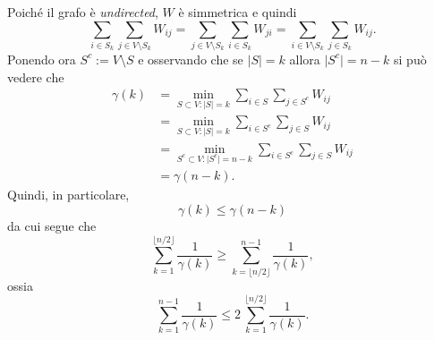 \begin{alphaparts}
Poiché il grafo è \textit{undirected}, $W$ è simmetrica e quindi
\[\sum_{i\in S_{k}} \sum_{j\in V\setminus S_{k} } W_{ij} =  \sum_{j\in V\setminus S_{k} } \sum_{i\in S_{k}} W_{ji} = \sum_{i\in V\setminus S_{k} } \sum_{j\in S_{k}} W_{ij}. \]
Ponendo ora \( S^{c} := V\setminus S \) e osservando che se \( \vert S \vert = k\) allora \(\vert S^{c} \vert = n-k\) si può vedere che
\begin{align}
\gamma(k) &= \min_{S\subset V : \vert S \vert = k} \sum_{i\in S}\sum_{j\in S^{c}} W_{ij} \nonumber\\
&= \min_{S\subset V : \vert S \vert = k} \sum_{i\in S^{c}}\sum_{j\in S} W_{ij} \nonumber\\
&= \min_{S^{c}\subset V : \vert S^{c} \vert = n - k} \sum_{i\in S^{c}}\sum_{j\in S} W_{ij} \nonumber\\
&= \gamma(n-k). \nonumber
\end{align}
Quindi, in particolare,
\[ \gamma(k) \le \gamma(n-k) \]
da cui segue che
\[\sum_{k = 1}^{\lfloor n/2\rfloor} \frac{1}{\gamma(k)} \ge \sum_{k = \lfloor n/2\rfloor}^{n-1} \frac{1}{\gamma(k)}, \]
ossia
\[\sum_{k = 1}^{n - 1} \frac{1}{\gamma(k)} \le 2\,\sum_{k = 1}^{\lfloor n/2\rfloor} \frac{1}{\gamma(k)}. \]
\end{alphaparts}